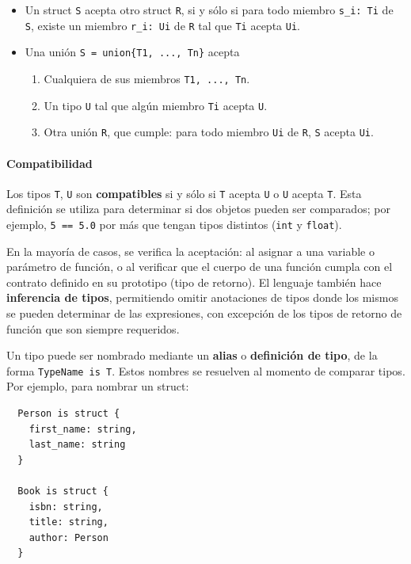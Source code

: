 \begin{itemize}
\begin{enumerate}
	\end{enumerate}
	\item Un struct \texttt{S} acepta otro struct \texttt{R}, si y sólo si para todo miembro \texttt{s\_i: Ti} de \texttt{S}, existe un miembro \texttt{r\_i: Ui} de \texttt{R} tal que \texttt{Ti} acepta \texttt{Ui}.
	\item Una unión \texttt{S = union\{T1, ..., Tn\}} acepta
	\begin{enumerate}
		\item Cualquiera de sus miembros \texttt{T1, ..., Tn}.
		\item Un tipo \texttt{U} tal que algún miembro \texttt{Ti} acepta \texttt{U}.
		\item Otra unión \texttt{R}, que cumple: para todo miembro \texttt{Ui} de \texttt{R}, \texttt{S} acepta \texttt{Ui}.
	\end{enumerate}
\end{itemize}

\paragraph{Compatibilidad}
Los tipos \texttt{T}, \texttt{U} son \textbf{compatibles} si y sólo si \texttt{T} acepta \texttt{U} o \texttt{U} acepta \texttt{T}. Esta definición se utiliza para determinar si dos objetos pueden ser comparados; por ejemplo, \texttt{5 == 5.0} por más que tengan tipos distintos (\texttt{int} y \texttt{float}).

En la mayoría de casos, se verifica la aceptación: al asignar a una variable o parámetro de función, o al verificar que el cuerpo de una función cumpla con el contrato definido en su prototipo (tipo de retorno). El lenguaje también hace \textbf{inferencia de tipos}, permitiendo omitir anotaciones de tipos donde los mismos se pueden determinar de las expresiones, con excepción de los tipos de retorno de función que son siempre requeridos.

Un tipo puede ser nombrado mediante un \textbf{alias} o \textbf{definición de tipo}, de la forma \texttt{TypeName is T}. Estos nombres se resuelven al momento de comparar tipos. Por ejemplo, para nombrar un struct:

\small
\begin{verbatim}
  Person is struct {
    first_name: string,
    last_name: string
  }

  Book is struct {
    isbn: string,
    title: string,
    author: Person
  }
\end{verbatim}
\normalsize

